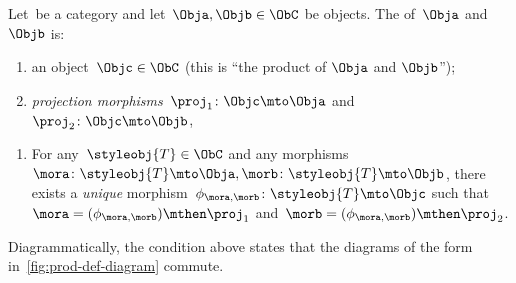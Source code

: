 \begin{ctdefinition}
	\label{def:categorical-product}
	Let~\CatC be a category and let~$\Obja, \Objb \in \ObC$ be objects.
	The \emph{} of~$\Obja$ and~$\Objb$ is: \\
	\constit
	\begin{enumerate}
		\item an object~$\Objc \in \ObC$ (this is ``the product of $\Obja$  and $\Objb$'');
		\item \emph{projection morphisms}~$\proj_1 \colon \Objc \mto \Obja$ and~$\proj_2 \colon \Objc \mto \Objb$,
	\end{enumerate}
	\condit
	\begin{enumerate}
		\item For any~$\styleobj{T} \in \ObC$ and any morphisms~$\mora \colon \styleobj{T} \mto \Obja, \morb \colon \styleobj{T} \mto \Objb$, there exists a \emph{unique} morphism~$\phi_{\mora,\morb} \colon \styleobj{T} \mto \Objc$ such that~$\mora = (\phi_{\mora,
				      \morb})\mthen \proj_1$ and~$\morb=(\phi_{\mora, \morb})\mthen \proj_2$.
	\end{enumerate}
\end{ctdefinition}

\begin{marginfigure}
	\centering
	\caption{}
	\label{fig:prod-def-diagram}
\end{marginfigure}

\begin{remark}
	\label{re:prod-comm-diag}
	Diagrammatically, the condition above states that the diagrams of the form in~\cref{fig:prod-def-diagram} commute.
\end{remark}

\begin{marginfigure}
	\centering
	\caption{}
	\label{fig:prod-def-diagram-generic}
\end{marginfigure}

